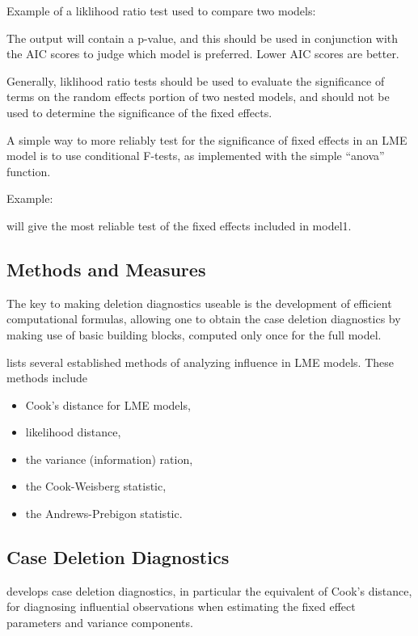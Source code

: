 \documentclass[12pt, a4paper]{report}
\theoremstyle{plain}
\theoremstyle{definition}
\theoremstyle{remark}
\begin{document}
	Example of a liklihood ratio test used to compare two models: 
	

	
	The output will contain a p-value, and this should be used in conjunction with the AIC scores to 
	judge which model is preferred. Lower AIC scores are better. 
	
	Generally, liklihood ratio tests should be used to evaluate the significance of terms on the 
	random effects portion of two nested models, and should not be used to determine the 
	significance of the fixed effects. 
	
	A simple way to more reliably test for the significance of fixed effects in an LME model is to use 
	conditional F-tests, as implemented with the simple “anova” function. 
	
	Example: 

	will give the most reliable test of the fixed effects included in model1. 

	
	\subsection{Methods and Measures}
	The key to making deletion diagnostics useable is the development of efficient computational formulas, allowing one to obtain the  case deletion diagnostics by making use of basic building blocks, computed only once for the full model.
	
	
	\citet{Zewotir} lists several established methods of analyzing influence in LME models. These methods include \begin{itemize}
		\item Cook's distance for LME models,
		\item {} likelihood distance,
		\item the variance (information) ration,
		\item the  Cook-Weisberg statistic,
		\item the  Andrews-Prebigon statistic.
	\end{itemize}

	

	
	\subsection{Case Deletion Diagnostics} %
	
	\citet{CPJ} develops  case deletion diagnostics, in particular the equivalent of  Cook's distance, for diagnosing influential observations when estimating the fixed effect parameters and variance components.
	
\end{document}
